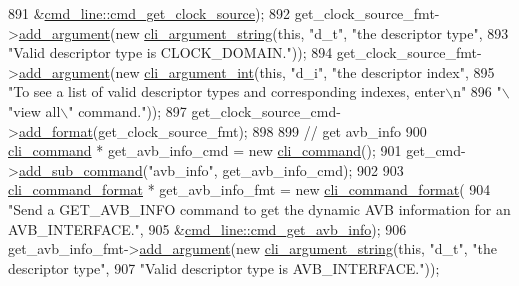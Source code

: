 \begin{DoxyCode}
891         &\hyperlink{classcmd__line_ae80c5fbd5e976997854ba7de5344d2ef}{cmd\_line::cmd\_get\_clock\_source});
892     get\_clock\_source\_fmt->\hyperlink{classcli__command__format_ac3fc6d13a227c195d5ee6f7b78eba9cd}{add\_argument}(\textcolor{keyword}{new} \hyperlink{classcli__argument__string}{cli\_argument\_string}(\textcolor{keyword}{this}, \textcolor{stringliteral}{"d\_t"}, \textcolor{stringliteral}{
      "the descriptor type"},
893                                                                \textcolor{stringliteral}{"Valid descriptor type is CLOCK\_DOMAIN."}));
894     get\_clock\_source\_fmt->\hyperlink{classcli__command__format_ac3fc6d13a227c195d5ee6f7b78eba9cd}{add\_argument}(\textcolor{keyword}{new} \hyperlink{classcli__argument__int}{cli\_argument\_int}(\textcolor{keyword}{this}, \textcolor{stringliteral}{"d\_i"}, \textcolor{stringliteral}{"the
       descriptor index"},
895                                                             \textcolor{stringliteral}{"To see a list of valid descriptor types and
       corresponding indexes, enter\(\backslash\)n"}
896                                                             \textcolor{stringliteral}{"\(\backslash\)"view all\(\backslash\)" command."}));
897     get\_clock\_source\_cmd->\hyperlink{classcli__command_aa9ec38e761644d946f8db2b920e39921}{add\_format}(get\_clock\_source\_fmt);
898 
899     \textcolor{comment}{// get avb\_info}
900     \hyperlink{classcli__command}{cli\_command} * get\_avb\_info\_cmd = \textcolor{keyword}{new} \hyperlink{classcli__command}{cli\_command}();
901     get\_cmd->\hyperlink{classcli__command_aa73a67e8ebb6facd4b40ced66279b226}{add\_sub\_command}(\textcolor{stringliteral}{"avb\_info"}, get\_avb\_info\_cmd);
902 
903     \hyperlink{classcli__command__format}{cli\_command\_format} * get\_avb\_info\_fmt = \textcolor{keyword}{new} 
      \hyperlink{classcli__command__format}{cli\_command\_format}(
904         \textcolor{stringliteral}{"Send a GET\_AVB\_INFO command to get the dynamic AVB information for an AVB\_INTERFACE."},
905         &\hyperlink{classcmd__line_a6a09693f01ee0f54f1513195b6d77122}{cmd\_line::cmd\_get\_avb\_info});
906     get\_avb\_info\_fmt->\hyperlink{classcli__command__format_ac3fc6d13a227c195d5ee6f7b78eba9cd}{add\_argument}(\textcolor{keyword}{new} \hyperlink{classcli__argument__string}{cli\_argument\_string}(\textcolor{keyword}{this}, \textcolor{stringliteral}{"d\_t"}, \textcolor{stringliteral}{"the
       descriptor type"},
907                                                            \textcolor{stringliteral}{"Valid descriptor type is AVB\_INTERFACE."}));

\end{DoxyCode}
